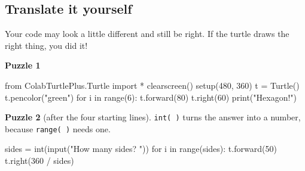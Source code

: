 \documentclass[12pt,a4paper]{article}
\newcommand{\py}{\lstinline[style=inl]}
\begin{document}
\subsection*{Translate it yourself}
Your code may look a little different and still be right. If the turtle draws the right thing, you did it!

\textbf{Puzzle 1}
\begin{codenonum}
from ColabTurtlePlus.Turtle import *
clearscreen()
setup(480, 360)
t = Turtle()
t.pencolor("green")
for i in range(6):
    t.forward(80)
    t.right(60)
print("Hexagon!")
\end{codenonum}

\textbf{Puzzle 2} (after the four starting lines). \py|int( )| turns the answer into a number, because \py|range( )| needs one.
\begin{codenonum}
sides = int(input("How many sides? "))
for i in range(sides):
    t.forward(50)
    t.right(360 / sides)
\end{codenonum}
\end{document}
